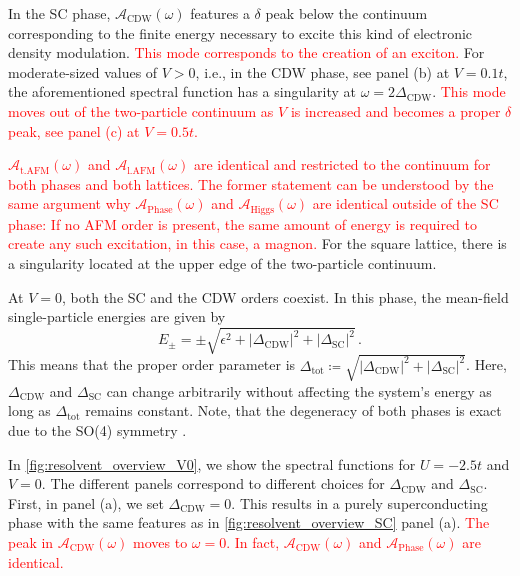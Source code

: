 \documentclass[
    reprint, 
    aps,
    preprintnumbers,
    twocolumn,
    prb,
    superscriptaddress
]{revtex4-2}
\newcommand{\spectral}[1]{\mathcal{A}_\text{#1}  (\omega)}
\newcommand{\markEdited}{red}
\begin{document}
In the SC phase, $\spectral{CDW}$ features a $\delta$ peak below the continuum corresponding to the finite energy necessary to excite this kind of electronic density modulation.
\textcolor{\markEdited}{This mode corresponds to the creation of an exciton.}
For moderate-sized values of $V>0$, i.e., in the CDW phase, see panel (b) at $V=0.1t$, the aforementioned spectral function has a singularity at $\omega=2\Delta_\text{CDW}$.%
\textcolor{\markEdited}{This mode moves out of the two-particle continuum as $V$ is increased and becomes a proper $\delta$ peak, see panel (c) at $V=0.5t$.}

\textcolor{\markEdited}{$\spectral{t.AFM}$ and $\spectral{l.AFM}$ are identical and restricted to the continuum for both phases and both lattices.
The former statement can be understood by the same argument why $\spectral{Phase}$ and $\spectral{Higgs}$ are identical outside of the SC phase:
If no AFM order is present, the same amount of energy is required to create any such excitation, in this case, a magnon.}
For the square lattice, there is a singularity located at the upper edge of the two-particle continuum.


At $V=0$, both the SC and the CDW orders coexist. 
In this phase, the mean-field single-particle energies are given by
\begin{equation}
    E_{\pm} = \pm \sqrt{\epsilon^2 + |\Delta_\text{CDW}|^2 + |\Delta_\text{SC}|^2}\,.
\end{equation}
This means that the proper order parameter is $\Delta_\text{tot} \coloneqq \sqrt{|\Delta_\text{CDW}|^2 + |\Delta_\text{SC}|^2}$.
Here, $\Delta_\text{CDW}$ and $\Delta_\text{SC}$ can change arbitrarily without affecting the system's energy as long as $\Delta_\text{tot}$ remains constant.
Note, that the degeneracy of both phases is exact due to the SO(4) symmetry \cite{yang90}. 

In \autoref{fig:resolvent_overview_V0}, we show the spectral functions for $U=-2.5t$ and $V=0$.
The different panels correspond to different choices for $\Delta_\text{CDW}$ and $\Delta_\text{SC}$.
First, in panel (a), we set $\Delta_\text{CDW} = 0$.
This results in a purely superconducting phase with the same features as in \autoref{fig:resolvent_overview_SC} panel (a).
\textcolor{\markEdited}{The peak in $\spectral{CDW}$ moves to $\omega=0$. In fact, $\spectral{CDW}$ and $\spectral{Phase}$ are identical.}
\end{document}
